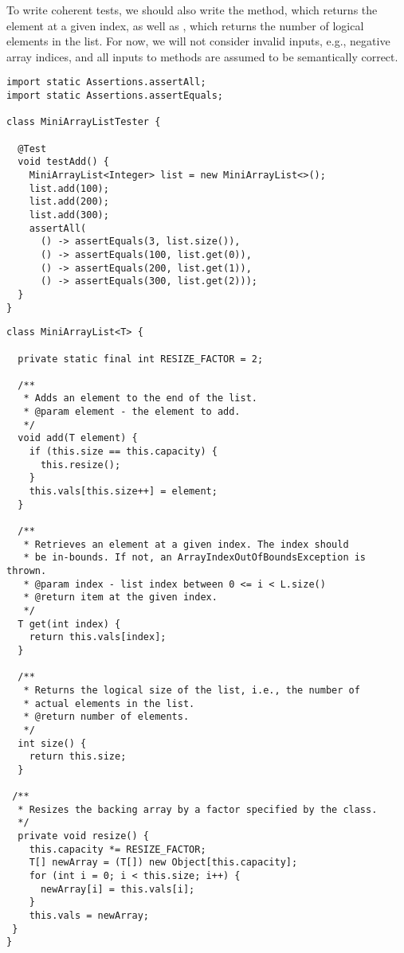 To write coherent tests, we should also write the  method, which returns the element at a given index, as well as , which returns the number of logical elements in the list. 
For now, we will not consider invalid inputs, e.g., negative array indices, and all inputs to methods are assumed to be semantically correct.

\begin{lstlisting}[language=MyJava]
import static Assertions.assertAll;
import static Assertions.assertEquals;

class MiniArrayListTester {

  @Test
  void testAdd() {
    MiniArrayList<Integer> list = new MiniArrayList<>();
    list.add(100);
    list.add(200);
    list.add(300);
    assertAll(
      () -> assertEquals(3, list.size()),
      () -> assertEquals(100, list.get(0)),
      () -> assertEquals(200, list.get(1)),
      () -> assertEquals(300, list.get(2)));
  }
}
\end{lstlisting}

\begin{lstlisting}[language=MyJava]
class MiniArrayList<T> {

  private static final int RESIZE_FACTOR = 2;

  /**
   * Adds an element to the end of the list.
   * @param element - the element to add.
   */
  void add(T element) {
    if (this.size == this.capacity) { 
      this.resize(); 
    }
    this.vals[this.size++] = element;
  }

  /**
   * Retrieves an element at a given index. The index should
   * be in-bounds. If not, an ArrayIndexOutOfBoundsException is thrown.
   * @param index - list index between 0 <= i < L.size()
   * @return item at the given index.
   */
  T get(int index) { 
    return this.vals[index]; 
  }

  /**
   * Returns the logical size of the list, i.e., the number of 
   * actual elements in the list.
   * @return number of elements.
   */
  int size() { 
    return this.size; 
  }

 /**
  * Resizes the backing array by a factor specified by the class.
  */
  private void resize() {
    this.capacity *= RESIZE_FACTOR;
    T[] newArray = (T[]) new Object[this.capacity];
    for (int i = 0; i < this.size; i++) { 
      newArray[i] = this.vals[i]; 
    }
    this.vals = newArray;
 }
}
\end{lstlisting}

